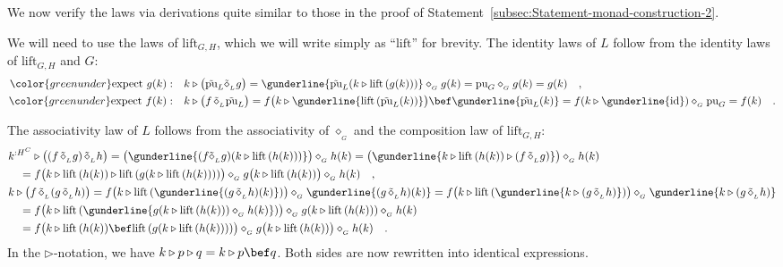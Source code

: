 We now verify the laws via derivations quite similar to those in the
proof of Statement~\ref{subsec:Statement-monad-construction-2}.

We will need to use the laws of $\text{lift}_{G,H}$, which we will
write simply as \textsf{``}$\text{lift}$\textsf{''} for brevity. The identity laws
of $L$ follow from the identity laws of $\text{lift}_{G,H}$ and
$G$:
\begin{align*}
{\color{greenunder}\text{expect }g(k):}\quad & k\triangleright\big(\tilde{\text{pu}}_{L}\tilde{\diamond}_{_{L}}g\big)=\gunderline{\tilde{\text{pu}}_{L}(k\triangleright\text{lift}\,(g(k)))}\diamond_{_{G}}g(k)=\text{pu}_{G}\diamond_{_{G}}g(k)=g(k)\quad,\\
{\color{greenunder}\text{expect }f(k):}\quad & k\triangleright\big(f\,\tilde{\diamond}_{_{L}}\tilde{\text{pu}}_{L}\big)=f\big(k\triangleright\gunderline{\text{lift}\,(\tilde{\text{pu}}_{L}(k))}\big)\bef\gunderline{\tilde{\text{pu}}_{L}(k)}=f(k\triangleright\gunderline{\text{id}})\diamond_{_{G}}\text{pu}_{G}=f(k)\quad.
\end{align*}

The associativity law of $L$ follows from the associativity of $\diamond_{_{G}}$
and the composition law of $\text{lift}_{G,H}$:
\begin{align*}
 & k^{:H^{C}}\triangleright\big((f\,\tilde{\diamond}_{_{L}}g)\,\tilde{\diamond}_{_{L}}h\big)=\big(\gunderline{(f\tilde{\diamond}_{_{L}}g)(k\triangleright\text{lift}\,(h(k)))}\big)\diamond_{_{G}}h(k)=\big(\gunderline{k\triangleright\text{lift}\,(h(k))\triangleright(f\,\tilde{\diamond}_{_{L}}g)}\big)\diamond_{_{G}}h(k)\\
 & \quad=f\big(k\triangleright\text{lift}\,(h(k))\triangleright\text{lift}\,(g(k\triangleright\text{lift}\,(h(k))))\big)\diamond_{_{G}}g\big(k\triangleright\text{lift}\,(h(k))\big)\diamond_{_{G}}h(k)\quad,\\
 & k\triangleright\big(f\,\tilde{\diamond}_{_{L}}(g\,\tilde{\diamond}_{_{L}}h)\big)=f\big(k\triangleright\text{lift}\,(\gunderline{(g\,\tilde{\diamond}_{_{L}}h)(k)})\big)\diamond_{_{G}}\gunderline{(g\,\tilde{\diamond}_{_{L}}h)(k)}=f\big(k\triangleright\text{lift}\,(\gunderline{k\triangleright(g\,\tilde{\diamond}_{_{L}}h)})\big)\diamond_{_{G}}\gunderline{k\triangleright(g\,\tilde{\diamond}_{_{L}}h)}\\
 & \quad=f\big(k\triangleright\text{lift}\,(\gunderline{g(k\triangleright\text{lift}\,(h(k)))\diamond_{_{G}}h(k)})\big)\diamond_{_{G}}g(k\triangleright\text{lift}\,(h(k)))\diamond_{_{G}}h(k)\\
 & \quad=f\big(k\triangleright\text{lift}\,(h(k))\bef\text{lift}\,(g(k\triangleright\text{lift}\,(h(k))))\big)\diamond_{_{G}}g\big(k\triangleright\text{lift}\,(h(k))\big)\diamond_{_{G}}h(k)\quad.
\end{align*}
In the $\triangleright$-notation, we have $k\triangleright p\triangleright q=k\triangleright p\bef q$.
Both sides are now rewritten into identical expressions.

